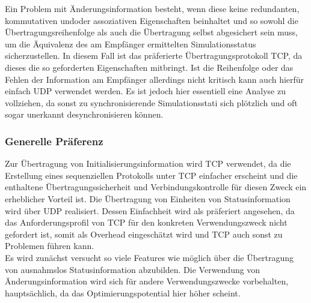 \documentclass[11pt,twoside,a4paper]{article}
\begin{document}
\begin{enumerate}
Ein Problem mit Änderungsinformation besteht, wenn diese keine redundanten, kommutativen und\/oder assoziativen Eigenschaften beinhaltet und so sowohl die Übertragungsreihenfolge als auch die Übertragung selbst abgesichert sein muss, um die Äquivalenz des am Empfänger ermittelten Simulationsstatus sicherzustellen. In diesem Fall ist das präferierte Übertragungsprotokoll TCP, da dieses die so geforderten Eigenschaften mitbringt. Ist die Reihenfolge oder das Fehlen der Information am Empfänger allerdings nicht kritisch kann auch hierfür einfach UDP verwendet werden. Es ist jedoch hier essentiell eine Analyse zu vollziehen, da sonst zu synchronisierende Simulationsstati sich plötzlich und oft sogar unerkannt desynchronisieren können.

\end{enumerate}

\subsubsection{Generelle Präferenz}
Zur Übertragung von Initialisierungsinformation wird TCP verwendet, da die Erstellung eines sequenziellen Protokolls unter TCP einfacher erscheint und die enthaltene Übertragungssicherheit und Verbindungskontrolle für diesen Zweck ein erheblicher Vorteil ist.
Die Übertragung von Einheiten von Statusinformation wird über UDP realisiert. Dessen Einfachheit wird als präferiert angesehen, da das Anforderungsprofil von TCP für den konkreten Verwendungszweck nicht gefordert ist, somit als Overhead eingeschätzt wird und TCP auch sonst zu Problemen führen kann.\\
Es wird zunächst versucht so viele Features wie möglich über die Übertragung von ausnahmslos Statusinformation abzubilden.
Die Verwendung von Änderungsinformation wird sich für andere Verwendungszwecke vorbehalten, hauptsächlich, da das Optimierungspotential hier höher scheint.
\end{document}
